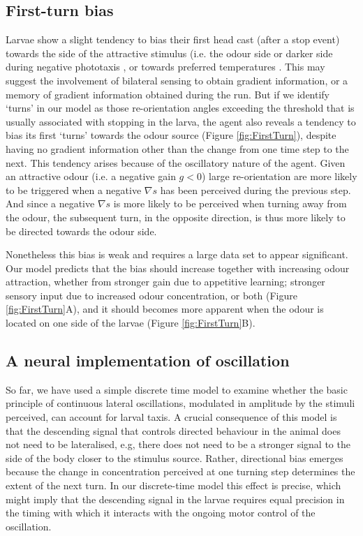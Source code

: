 \documentclass[11pt,a4paper]{article}
\begin{document}
\subsection{First-turn bias}
Larvae show a slight tendency to bias their first head cast (after a stop event) towards the side of the attractive stimulus (i.e. the odour side \citep{gomez2011active,gomez2012active} or darker side during negative phototaxis \citep{kane2013sensorimotor}, or towards preferred temperatures \citep{luo2010navigational}. This may suggest the involvement of bilateral sensing to obtain gradient information, or a memory of gradient information obtained during the run. But if we identify ‘turns’ in our model as those re-orientation angles exceeding the threshold that is usually associated with stopping in the larva, the agent also reveals a tendency to bias its first `turns' towards the odour source (Figure \ref{fig:FirstTurn}), despite having no gradient information other than the change from one time step to the next. This tendency arises because of the oscillatory nature of the agent. Given an attractive odour (i.e. a negative gain $g<0$) large re-orientation are more likely to be triggered when a negative $\nabla s$ has been perceived during the previous step. And since a negative $\nabla s$ is more likely to be perceived when turning away from the odour, the subsequent turn, in the opposite direction, is thus more likely to be directed towards the odour side. 

Nonetheless this bias is weak and requires a large data set to appear significant. Our model predicts that the bias should increase together with increasing odour attraction, whether from stronger gain due to appetitive learning; stronger sensory input due to increased odour concentration, or both (Figure \ref{fig:FirstTurn}A), and it should becomes more apparent when the odour is located on one side of the larvae (Figure \ref{fig:FirstTurn}B).

\subsection{A neural implementation of oscillation}
So far, we have used a simple discrete time model to examine whether the basic principle of continuous lateral oscillations, modulated in amplitude by the stimuli perceived, can account for larval taxis.
 A crucial consequence of this model is that the descending signal that controls directed behaviour in the animal does not need to be lateralised, e.g, there does not need to be a stronger signal to the side of the body closer to the stimulus source. Rather, directional bias emerges because the change in concentration perceived at one turning step determines the extent of the next turn.
  In our discrete-time model this effect is precise, which might imply that the descending signal in the larvae requires equal precision in the timing with which it interacts with the ongoing motor control of the oscillation.
\end{document}

